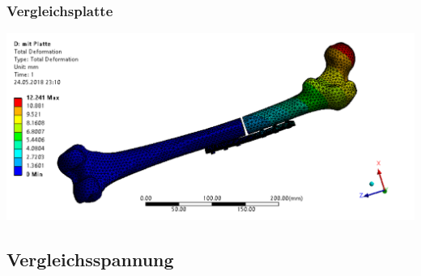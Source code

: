 		\subsubsection{Vergleichsplatte}
	
			\begin{Figure}
				\centering
				\includegraphics[width=15cm]{content/images/vergleich_deformation.png}
				\label{fig:vergleich_deformation}
			\end{Figure}
	
	\subsection{Vergleichsspannung}
	
